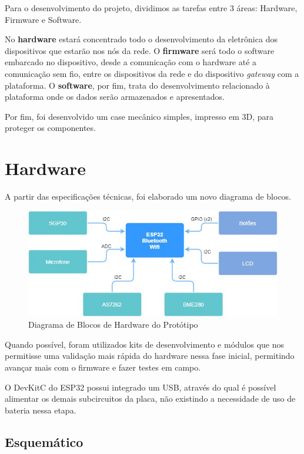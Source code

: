 \documentclass[../monografia.tex]{subfiles}
\begin{document}
Para o desenvolvimento do projeto, dividimos as tarefas entre 3 áreas: Hardware, Firmware e Software. 

No \textbf{hardware} estará concentrado todo o desenvolvimento da eletrônica dos dispositivos que estarão nos nós da rede. 
O \textbf{firmware} será todo o software embarcado no dispositivo, desde a comunicação com o hardware até a comunicação sem fio, entre os dispositivos da rede e do dispositivo \textit{gateway} com a plataforma. 
O \textbf{software}, por fim, trata do desenvolvimento relacionado à plataforma onde os dados serão armazenados e apresentados. 

Por fim, foi desenvolvido um case mecânico simples, impresso em 3D, para proteger os componentes. 

\section{Hardware}

A partir das especificações técnicas, foi elaborado um novo diagrama de blocos. 

\begin{figure}[h]
    \centering
    \includegraphics[width=12cm]{diagrama_hw_v1}
    \caption{Diagrama de Blocos de Hardware do Protótipo}
    \label{fig:img1}
\end{figure}

Quando possível, foram utilizados kits de desenvolvimento e módulos que nos permitisse uma validação mais rápida do hardware nessa fase inicial, permitindo avançar mais com o firmware e fazer testes em campo. 

O DevKitC do ESP32 possui integrado um USB, através do qual é possível alimentar os demais subcircuitos da placa, não existindo a necessidade de uso de bateria nessa etapa. 

\subsection{Esquemático}
\end{document}
